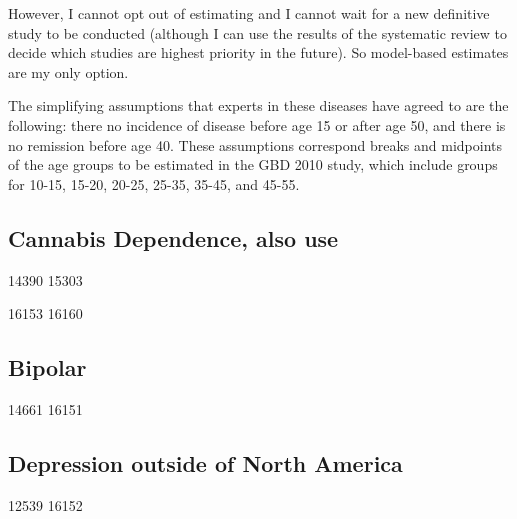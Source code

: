 However, I cannot opt out of estimating and I cannot wait for a new
definitive study to be conducted (although I can use the results of
the systematic review to decide which studies are highest priority in
the future).  So model-based estimates are my only option.

The simplifying assumptions that experts in these diseases have agreed
to are the following: there no incidence of disease before age 15 or
after age 50, and there is no remission before age 40.  These
assumptions correspond breaks and midpoints of the age groups to be
estimated in the GBD 2010 study, which include groups for 10-15,
15-20, 20-25, 25-35, 35-45, and 45-55.



\subsection{Cannabis Dependence, also use}
14390 15303 

16153 16160 

\subsection{Bipolar}
14661 
16151 

\subsection{Depression outside of North America}
12539 
16152
